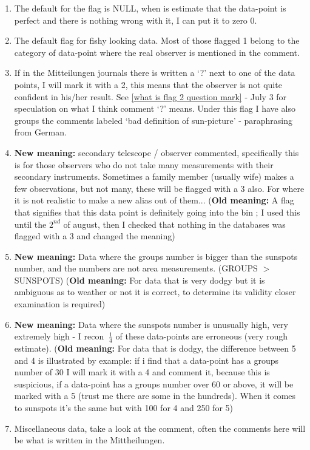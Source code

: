 \documentclass[12pt]{article}
\begin{document}
\begin{enumerate}[start=0]
    \item The default for the flag is NULL, when is estimate that the data-point is perfect and there is nothing wrong with it, I can put it to zero 0.
    \item The default flag for fishy looking data. Most of those flagged 1 belong to the category of data-point where the real observer is mentioned in the comment.
    \item If in the Mitteilungen journals there is written a `?' next to one of the data points, I will mark it with a 2, this means that the observer is not quite confident in his/her result. See \ref{what is flag 2 question mark} - July 3 for speculation on what I think comment `?' means. Under this flag I have also groups the comments labeled `bad definition of sun-picture' - paraphrasing from German.
    \item \textbf{New meaning:} secondary telescope / observer commented, specifically this is for those observers who do not take many measurements with their secondary instruments. Sometimes a family member (usually wife) makes a few observations, but not many, these will be flagged with a 3 also. For where it is not realistic to make a new alias out of them... (\textbf{Old meaning:} A flag that signifies that this data point is definitely going into the bin ; I used this until the $2^{nd}$ of august, then I checked that nothing in the databases was flagged with a 3 and changed the meaning)
    \item \textbf{New meaning:} Data where the groups number is bigger than the sunspots number, and the numbers are not area measurements. (GROUPS $>$ SUNSPOTS) (\textbf{Old meaning:} For data that is very dodgy but it is ambiguous as to weather or not it is correct, to determine its validity closer examination is required)
    \item \textbf{New meaning:} Data where the sunspots number is unusually high, very extremely high - I recon $~\frac{1}{4}$ of these data-points are erroneous (very rough estimate). (\textbf{Old meaning:} For data that is dodgy, the difference between 5 and 4 is illustrated by example: if i find that a data-point has a groups number of 30 I will mark it with a 4 and comment it, because this is suspicious, if a data-point has a groups number over 60 or above, it will be marked with a 5 (trust me there are some in the hundreds). When it comes to sunspots it's the same but with 100 for 4 and 250 for 5)
    \item Miscellaneous data, take a look at the comment, often the comments here will be what is written in the Mittheilungen.

\end{enumerate}
\end{document}
